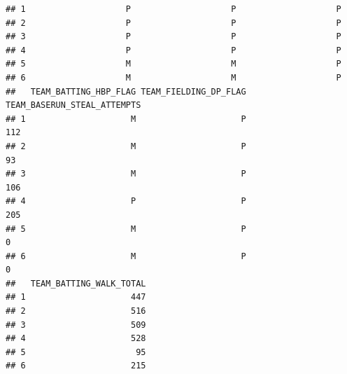 \documentclass[
]{article}
\begin{document}
\begin{verbatim}
## 1                    P                    P                    P
## 2                    P                    P                    P
## 3                    P                    P                    P
## 4                    P                    P                    P
## 5                    M                    M                    P
## 6                    M                    M                    P
##   TEAM_BATTING_HBP_FLAG TEAM_FIELDING_DP_FLAG TEAM_BASERUN_STEAL_ATTEMPTS
## 1                     M                     P                         112
## 2                     M                     P                          93
## 3                     M                     P                         106
## 4                     P                     P                         205
## 5                     M                     P                           0
## 6                     M                     P                           0
##   TEAM_BATTING_WALK_TOTAL
## 1                     447
## 2                     516
## 3                     509
## 4                     528
## 5                      95
## 6                     215
\end{verbatim}
\end{document}
